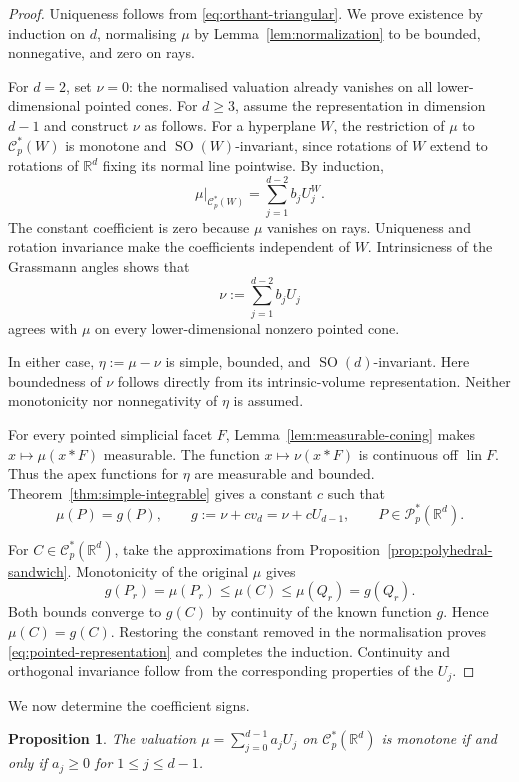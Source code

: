 \documentclass[11pt]{article}
\newcommand{\R}{\mathbb{R}}
\newcommand{\CC}{\mathcal{C}}
\newcommand{\PP}{\mathcal{P}}
\newcommand{\SOn}[1]{\operatorname{SO}(#1)}
\newcommand{\SO}{\operatorname{SO}}
\newcommand{\lin}{\operatorname{lin}}
\theoremstyle{plain}
\newtheorem{proposition}[theorem]{Proposition}
\theoremstyle{definition}
\begin{document}
\begin{proof}
Uniqueness follows from \eqref{eq:orthant-triangular}.
We prove existence by induction on $d$, normalising $\mu$ by
Lemma~\ref{lem:normalization} to be bounded, nonnegative, and zero
on rays.

For $d=2$, set $\nu=0$: the normalised valuation already vanishes
on all lower-dimen\-sional pointed cones.
For $d\ge3$, assume the representation in dimension $d-1$ and
construct $\nu$ as follows.
For a hyperplane $W$, the restriction of $\mu$ to $\CC_p^*(W)$ is
monotone and $\SO(W)$-invariant, since rotations of $W$ extend to
rotations of $\R^d$ fixing its normal line pointwise.
By induction,
\[
  \mu|_{\CC_p^*(W)}=\sum_{j=1}^{d-2}b_jU_j^W.
\]
The constant coefficient is zero because $\mu$ vanishes on rays.
Uniqueness and rotation invariance make the coefficients independent
of $W$.  Intrinsicness of the Grassmann angles shows that
\[
  \nu:=\sum_{j=1}^{d-2}b_jU_j
\]
agrees with $\mu$ on every lower-dimensional nonzero pointed cone.

In either case, $\eta:=\mu-\nu$ is simple, bounded, and
$\SOn d$-invariant.
Here boundedness of $\nu$ follows directly from its intrinsic-volume
representation.  Neither monotonicity nor nonnegativity of $\eta$
is assumed.

For every pointed simplicial facet $F$,
Lemma~\ref{lem:measurable-coning} makes $x\mapsto\mu(x*F)$ measurable.
The function $x\mapsto\nu(x*F)$ is continuous off $\lin F$.
Thus the apex functions for $\eta$ are measurable and bounded.
Theorem~\ref{thm:simple-integrable} gives a constant $c$ such that
\[
  \mu(P)=g(P),\qquad
  g:=\nu+cv_d=\nu+cU_{d-1},
  \qquad P\in\PP_p^*(\R^d).
\]

For $C\in\CC_p^*(\R^d)$, take the approximations from
Proposition~\ref{prop:polyhedral-sandwich}.  Monotonicity of the
original $\mu$ gives
\begin{equation}\label{eq:monotone-sandwich}
  g(P_r)=\mu(P_r)\le\mu(C)\le\mu(Q_r)=g(Q_r).
\end{equation}
Both bounds converge to $g(C)$ by continuity of the known function $g$.
Hence $\mu(C)=g(C)$.  Restoring the constant removed in the
normalisation proves \eqref{eq:pointed-representation} and completes
the induction.  Continuity and orthogonal invariance follow from
the corresponding properties of the $U_j$.
\end{proof}

We now determine the coefficient signs.

\begin{proposition}\label{prop:coefficient-signs}
The valuation $\mu=\sum_{j=0}^{d-1}a_jU_j$ on $\CC_p^*(\R^d)$
is monotone if and only if $a_j\ge0$ for $1\le j\le d-1$.
\end{proposition}
\end{document}
